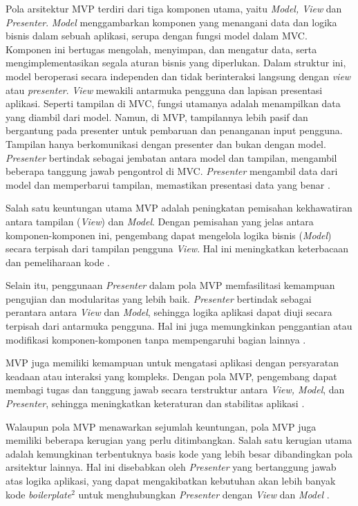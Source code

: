 \documentclass[conference]{IEEEtran}
\begin{document}
	Pola arsitektur MVP terdiri dari tiga komponen utama, yaitu \textit{Model, View} dan \textit{Presenter}.
	\textit{Model} menggambarkan komponen yang menangani data dan logika bisnis dalam sebuah aplikasi, serupa dengan fungsi model dalam MVC. Komponen ini bertugas mengolah, menyimpan, dan mengatur data, serta mengimplementasikan segala aturan bisnis yang diperlukan. Dalam struktur ini, model beroperasi secara independen dan tidak berinteraksi langsung dengan \textit{view} atau \textit{presenter}.
	\textit{View} mewakili antarmuka pengguna dan lapisan presentasi aplikasi. Seperti tampilan di MVC, fungsi utamanya adalah menampilkan data yang diambil dari model. Namun, di MVP, tampilannya lebih pasif dan bergantung pada presenter untuk pembaruan dan penanganan input pengguna. Tampilan hanya berkomunikasi dengan presenter dan bukan dengan model.
	\textit{Presenter} bertindak sebagai jembatan antara model dan tampilan, mengambil beberapa tanggung jawab pengontrol di MVC. \textit{Presenter} mengambil data dari model dan memperbarui tampilan, memastikan presentasi data yang benar \cite{Dan2020}. 
	
	Salah satu keuntungan utama MVP adalah peningkatan pemisahan kekhawatiran antara tampilan (\textit{View}) dan \textit{Model}. Dengan pemisahan yang jelas antara komponen-komponen ini, pengembang dapat mengelola logika bisnis (\textit{Model}) secara terpisah dari tampilan pengguna \textit{View}. Hal ini meningkatkan keterbacaan dan pemeliharaan kode \cite{brp2020}. 
	
	Selain itu, penggunaan \textit{Presenter} dalam pola MVP memfasilitasi kemampuan pengujian dan modularitas yang lebih baik. \textit{Presenter} bertindak sebagai perantara antara \textit{View} dan \textit{Model}, sehingga logika aplikasi dapat diuji secara terpisah dari antarmuka pengguna. Hal ini juga memungkinkan penggantian atau modifikasi komponen-komponen tanpa mempengaruhi bagian lainnya \cite{brp2020}.
	
	MVP juga memiliki kemampuan untuk mengatasi aplikasi dengan persyaratan keadaan atau interaksi yang kompleks. Dengan pola MVP, pengembang dapat membagi tugas dan tanggung jawab secara terstruktur antara \textit{View, Model}, dan \textit{Presenter}, sehingga meningkatkan keteraturan dan stabilitas aplikasi \cite{brp2020}.
	
	Walaupun pola MVP menawarkan sejumlah keuntungan, pola MVP juga memiliki beberapa kerugian yang perlu ditimbangkan. Salah satu kerugian utama adalah kemungkinan terbentuknya basis kode yang lebih besar dibandingkan pola arsitektur lainnya. Hal ini disebabkan oleh \textit{Presenter} yang bertanggung jawab atas logika aplikasi, yang dapat mengakibatkan kebutuhan akan lebih banyak kode \textit{boilerplate}$^2$ untuk menghubungkan \textit{Presenter} dengan \textit{View} dan \textit{Model} \cite{brp2020}.
	
\end{document}
